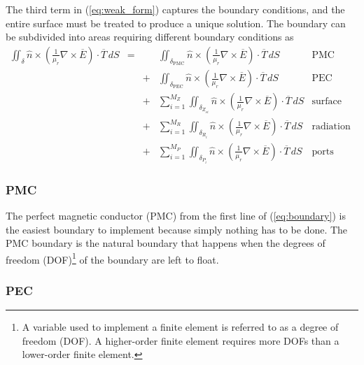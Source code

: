 \documentclass[titlepage]{article}
\renewcommand\_{\textunderscore\linebreak[1]}
\begin{document}
The third term in (\ref{eq:weak_form}) captures the boundary conditions, and the entire surface must be treated to produce a unique solution.  The boundary can be subdivided into areas requiring different boundary conditions as
\begin{equation}
\label{eq:boundary}
\begin{array}{rcclr}
\iint_{\delta}\hat{n}\times(\frac{1}{\mu_r}\nabla\times\overline{E})\cdot\overline{T}\,dS & = &   & \iint_{\delta_{\text{PMC}}}\hat{n}\times(\frac{1}{\mu_r}\nabla\times\overline{E})\cdot\overline{T}\,dS & \text{PMC} \\[5pt]
                                                                                          &   & + & \iint_{\delta_{\text{PEC}}}\hat{n}\times(\frac{1}{\mu_r}\nabla\times\overline{E})\cdot\overline{T}\,dS & \text{PEC} \\[5pt]
                                                                                          &   & + & \sum_{i=1}^{M_Z}\iint_{\delta_{Z_{si}}}\hat{n}\times(\frac{1}{\mu_r}\nabla\times\overline{E})\cdot\overline{T}\,dS & \text{surface impedance}\\[5pt]
                                                                                          &   & + & \sum_{i=1}^{M_R}\iint_{\delta_{R_{i}}}\hat{n}\times(\frac{1}{\mu_r}\nabla\times\overline{E})\cdot\overline{T}\,dS & \text{radiation}\\[5pt]
                                                                                          &   & + & \sum_{i=1}^{M_P}\iint_{\delta_{P_{i}}}\hat{n}\times(\frac{1}{\mu_r}\nabla\times\overline{E})\cdot\overline{T}\,dS  & \text{ports}
\end{array}
\end{equation}

\subsubsection{PMC}

The perfect magnetic conductor (PMC) from the first line of (\ref{eq:boundary}) is the easiest boundary to implement because simply nothing has to be done. The PMC boundary is the natural boundary that happens when the degrees of freedom (DOF)\footnote{A variable used to implement a finite element is referred to as a degree of freedom (DOF).  A higher-order finite element requires more DOFs than a lower-order finite element.} of the boundary are left to float.

\subsubsection{PEC}
\end{document}
